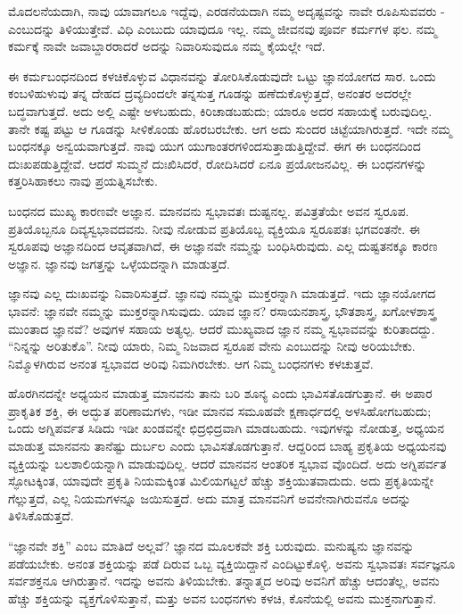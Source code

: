 ಮೊದಲನೆಯದಾಗಿ, ನಾವು ಯಾವಾಗಲೂ ಇದ್ದೆವು, ಎರಡನೆಯದಾಗಿ ನಮ್ಮ ಅದೃಷ್ಟವನ್ನು ನಾವೇ ರೂಪಿಸುವವರು - ಎಂಬುದನ್ನು ತಿಳಿಯುತ್ತೇವೆ. ವಿಧಿ ಎಂಬುದು ಯಾವುದೂ ಇಲ್ಲ. ನಮ್ಮ ಜೀವನವು ಪೂರ್ವ ಕರ್ಮಗಳ ಫಲ. ನಮ್ಮ ಕರ್ಮಕ್ಕೆ ನಾವೇ ಜವಾಬ್ದಾರರಾದರೆ ಅದನ್ನು ನಿವಾರಿಸುವುದೂ ನಮ್ಮ ಕೈಯಲ್ಲೇ ಇದೆ.

ಈ ಕರ್ಮಬಂಧನದಿಂದ ಕಳಚಿಕೊಳ್ಳುವ ವಿಧಾನವನ್ನು ತೋರಿಸಿಕೊಡುವುದೇ ಒಟ್ಟು ಜ್ಞಾನಯೋಗದ ಸಾರ. ಒಂದು ಕಂಬಳಿಹುಳುವು ತನ್ನ ದೇಹದ ದ್ರವ್ಯದಿಂದಲೇ ತನ್ನಸುತ್ತ ಗೂಡನ್ನು ಹಣೆದುಕೊಳ್ಳುತ್ತದೆ, ಅನಂತರ ಅದರಲ್ಲೇ ಬದ್ಧವಾಗುತ್ತದೆ. ಅದು ಅಲ್ಲಿ ಎಷ್ಟೇ ಅಳಬಹುದು, ಕಿರಿಚಾಡಬಹುದು; ಯಾರೂ ಅದರ ಸಹಾಯಕ್ಕೆ ಬರುವುದಿಲ್ಲ. ತಾನೇ ಕಷ್ಟ ಪಟ್ಟು ಆ ಗೂಡನ್ನು ಸೀಳಿಕೊಂಡು ಹೊರಬರಬೇಕು. ಆಗ ಅದು ಸುಂದರ ಚಿಟ್ಟೆಯಾಗಿರುತ್ತದೆ. ಇದೇ ನಮ್ಮ ಬಂಧನಕ್ಕೂ ಅನ್ವಯವಾಗುತ್ತದೆ. ನಾವು ಯುಗ ಯುಗಾಂತರಗಳಿಂದಸುತ್ತಾಡುತ್ತಿದ್ದೇವೆ. ಈಗ ಈ ಬಂಧನದಿಂದ ದುಃಖಪಡುತ್ತಿದ್ದೇವೆ. ಆದರೆ ಸುಮ್ಮನೆ ದುಃಖಿಸಿದರೆ, ರೋದಿಸಿದರೆ ಏನೂ ಪ್ರಯೋಜನವಿಲ್ಲ. ಈ ಬಂಧನಗಳನ್ನು ಕತ್ತರಿಸಿಹಾಕಲು ನಾವು ಪ್ರಯತ್ನಿಸಬೇಕು.

ಬಂಧನದ ಮುಖ್ಯ ಕಾರಣವೇ ಅಜ್ಞಾನ. ಮಾನವನು ಸ್ವಭಾವತಃ ದುಷ್ಟನಲ್ಲ. ಪವಿತ್ರತೆಯೇ ಅವನ ಸ್ವರೂಪ. ಪ್ರತಿಯೊಬ್ಬನೂ ದಿವ್ಯಸ್ವಭಾವದವನು. ನೀವು ನೋಡುವ ಪ್ರತಿಯೊಬ್ಬ ವ್ಯಕ್ತಿಯೂ ಸ್ವರೂಪತಃ ಭಗವಂತನೇ. ಈ ಸ್ವರೂಪವು ಅಜ್ಞಾನದಿಂದ ಆವೃತವಾಗಿದೆ, ಈ ಅಜ್ಞಾನವೇ ನಮ್ಮನ್ನು ಬಂಧಿಸಿರುವುದು. ಎಲ್ಲ ದುಷ್ಟತನಕ್ಕೂ ಕಾರಣ ಅಜ್ಞಾನ. ಜ್ಞಾನವು ಜಗತ್ತನ್ನು ಒಳ್ಳೆಯದನ್ನಾಗಿ ಮಾಡುತ್ತದೆ.

ಜ್ಞಾನವು ಎಲ್ಲ ದುಃಖವನ್ನು ನಿವಾರಿಸುತ್ತದೆ. ಜ್ಞಾನವು ನಮ್ಮನ್ನು ಮುಕ್ತರನ್ನಾಗಿ ಮಾಡುತ್ತದೆ. ಇದು ಜ್ಞಾನಯೋಗದ ಭಾವನೆ: ಜ್ಞಾನವೇ ನಮ್ಮನ್ನು ಮುಕ್ತರನ್ನಾಗಿಸುವುದು. ಯಾವ ಜ್ಞಾನ? ರಸಾಯನಶಾಸ್ತ್ರ, ಭೌತಶಾಸ್ತ್ರ, ಖಗೋಳಶಾಸ್ತ್ರ ಮುಂತಾದ ಜ್ಞಾನವೆ? ಅವುಗಳ ಸಹಾಯ ಅತ್ಯಲ್ಪ. ಆದರೆ ಮುಖ್ಯವಾದ ಜ್ಞಾನ ನಮ್ಮ ಸ್ವಭಾವವನ್ನು ಕುರಿತಾದದ್ದು. “ನಿನ್ನನ್ನು ಅರಿತುಕೊ”. ನೀವು ಯಾರು, ನಿಮ್ಮ ನಿಜವಾದ ಸ್ವರೂಪ ವೇನು ಎಂಬುದನ್ನು ನೀವು ಅರಿಯಬೇಕು. ನಿಮ್ಮೊಳಗಿರುವ ಅನಂತ ಸ್ವಭಾವದ ಅರಿವು ನಿಮಗಿರಬೇಕು. ಆಗ ನಿಮ್ಮ ಬಂಧನಗಳು ಕಳಚುತ್ತವೆ.

ಹೊರಗಿನದನ್ನೇ ಅಧ್ಯಯನ ಮಾಡುತ್ತ ಮಾನವನು ತಾನು ಬರಿ ಶೂನ್ಯ ಎಂದು ಭಾವಿಸತೊಡಗುತ್ತಾನೆ. ಈ ಅಪಾರ ಪ್ರಾಕೃತಿಕ ಶಕ್ತಿ, ಈ ಅದ್ಭುತ ಪರಿಣಾಮಗಳು, ಇಡೀ ಮಾನವ ಸಮೂಹವೇ ಕ್ಷಣಾರ್ಧದಲ್ಲಿ ಅಳಸಿಹೋಗಬಹುದು; ಒಂದು ಅಗ್ನಿಪರ್ವತ ಸಿಡಿದು ಇಡೀ ಖಂಡವನ್ನೇ ಛಿದ್ರಛಿದ್ರವಾಗಿ ಮಾಡಬಹುದು. ಇವುಗಳನ್ನು ನೋಡುತ್ತ, ಅಧ್ಯಯನ ಮಾಡುತ್ತ ಮಾನವನು ತಾನೆಷ್ಟು ದುರ್ಬಲ ಎಂದು ಭಾವಿಸತೊಡಗುತ್ತಾನೆ. ಆದ್ದರಿಂದ ಬಾಹ್ಯ ಪ್ರಕೃತಿಯ ಅಧ್ಯಯನವು ವ್ಯಕ್ತಿಯನ್ನು ಬಲಶಾಲಿಯನ್ನಾಗಿ ಮಾಡುವುದಿಲ್ಲ. ಆದರೆ ಮಾನವನ ಆಂತರಿಕ ಸ್ವಭಾವ ವೊಂದಿದೆ. ಅದು ಅಗ್ನಿಪರ್ವತ ಸ್ಫೋಟಕ್ಕಿಂತ, ಯಾವುದೇ ಪ್ರಕೃತಿ ನಿಯಮಕ್ಕಿಂತ ಮಿಲಿಯಗಟ್ಟಲೆ ಹೆಚ್ಚು ಶಕ್ತಿಯುತವಾದುದು. ಅದು ಪ್ರಕೃತಿಯನ್ನೇ ಗೆಲ್ಲುತ್ತದೆ, ಎಲ್ಲ ನಿಯಮಗಳನ್ನೂ ಜಯಿಸುತ್ತದೆ. ಅದು ಮಾತ್ರ ಮಾನವನಿಗೆ ಅವನೇನಾಗಿರುವನೊ ಅದನ್ನು ತಿಳಿಸಿಕೊಡುತ್ತದೆ.

“ಜ್ಞಾನವೇ ಶಕ್ತಿ” ಎಂಬ ಮಾತಿದೆ ಅಲ್ಲವೆ? ಜ್ಞಾನದ ಮೂಲಕವೇ ಶಕ್ತಿ ಬರುವುದು. ಮನುಷ್ಯನು ಜ್ಞಾನವನ್ನು ಪಡೆಯಬೇಕು. ಅನಂತ ಶಕ್ತಿಯನ್ನು ಪಡೆ ದಿರುವ ಒಬ್ಬ ವ್ಯಕ್ತಿಯಿದ್ದಾನೆ ಎಂದಿಟ್ಟುಕೊಳ್ಳಿ. ಅವನು ಸ್ವಭಾವತಃ ಸರ್ವಜ್ಞನೂ ಸರ್ವಶಕ್ತನೂ ಆಗಿರುತ್ತಾನೆ. ಇದನ್ನು ಅವನು ತಿಳಿಯಬೇಕು. ತನ್ನಾತ್ಮದ ಅರಿವು ಅವನಿಗೆ ಹೆಚ್ಚು ಆದಂತೆಲ್ಲ, ಅವನು ಹೆಚ್ಚು ಶಕ್ತಿಯನ್ನು ವ್ಯಕ್ತಗೊಳಿಸುತ್ತಾನೆ, ಮತ್ತು ಅವನ ಬಂಧನಗಳು ಕಳಚಿ, ಕೊನೆಯಲ್ಲಿ ಅವನು ಮುಕ್ತನಾಗುತ್ತಾನೆ.


